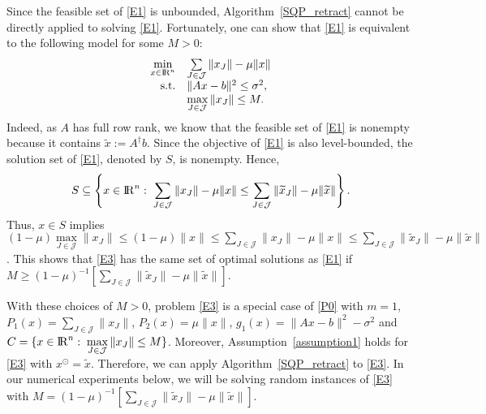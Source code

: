 \documentclass[10pt]{article}
\numberwithin{equation}{section}
\def\R{{\rm I\!R}}
\def\tx{{\widetilde x}}
\def\xfeas{x^\odot}
\begin{document}
Since the feasible set of \eqref{E1} is unbounded, Algorithm~\ref{SQP_retract} cannot be directly applied to solving \eqref{E1}. Fortunately, one can show that \eqref{E1} is equivalent to the following model for some $M > 0$:
\begin{equation}\label{E3}
  \begin{array}{rl}
\min\limits_{x\in\R^n} & \sum\limits_{J\in\mathcal{J}}\|x_J\| - \mu\|x\| \\
{\rm s.t.} & \|Ax - b\|^2\leq \sigma^2,\\
           & \max\limits_{J\in \mathcal{J}}\|x_J\| \leq M.
  \end{array}
\end{equation}
Indeed, as $A$ has full row rank, we know that the feasible set of \eqref{E1} is nonempty because it contains $\tx := A^\dagger b$. Since the objective of \eqref{E1} is also level-bounded, the solution set of \eqref{E1}, denoted by $S$, is nonempty. Hence,
\[
S\subseteq \left\{x\in\R^n:\; \sum\limits_{J\in\mathcal{J}}\|x_J\| - \mu\|x\| \le \sum\limits_{J\in\mathcal{J}}\|\tx_J\| - \mu\|\tx\|\right\}.
\]
Thus, $x\in S$ implies $(1 - \mu)\max\limits_{J\in \mathcal{J}}\|x_J\| \le (1 - \mu)\|x\|\le \sum\limits_{J\in\mathcal{J}}\|x_J\| - \mu\|x\| \le \sum\limits_{J\in\mathcal{J}}\|\tx_J\| - \mu\|\tx\|$. This shows that \eqref{E3} has the same set of optimal solutions as \eqref{E1} if $M \ge (1 - \mu)^{-1}[\sum\limits_{J\in\mathcal{J}}\|\tx_J\| - \mu\|\tx\|]$.

With these choices of $M > 0$, problem \eqref{E3} is a special case of \eqref{P0} with $m = 1$, $P_1(x)= \sum\limits_{J\in\mathcal{J}}\|x_J\|$, $P_2(x) = \mu\|x\|$, $g_1(x) = \|Ax - b\|^2 - \sigma^2$ and $C = \{x\in\R^n:\; \max\limits_{J\in \mathcal{J}}\|x_J\| \leq M\}$. Moreover, Assumption~\ref{assumption1} holds for \eqref{E3} with $\xfeas = \tx$. Therefore, we can apply Algorithm~\ref{SQP_retract} to \eqref{E3}. In our numerical experiments below, we will be solving random instances of \eqref{E3} with $M = (1 - \mu)^{-1}[\sum\limits_{J\in\mathcal{J}}\|\tx_J\| - \mu\|\tx\|]$.
\end{document}
